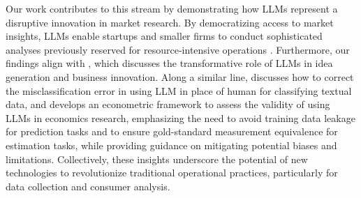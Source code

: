 Our work contributes to this stream by demonstrating how LLMs represent a disruptive innovation in market research. By democratizing access to market insights, LLMs enable startups and smaller firms to conduct sophisticated analyses previously reserved for resource-intensive operations \citep{olsen2020industry, choi2022disruptive}. Furthermore, our findings align with \cite{girotra2023ideas}, which discusses the transformative role of LLMs in idea generation and business innovation.
Along a similar line, \cite{connell2024estimating} discusses how to correct the misclassification error in using LLM in place of human for classifying textual data, and \cite{ludwig2024large} develops an econometric framework to assess the validity of using LLMs in economics research, emphasizing the need to avoid training data leakage for prediction tasks and to ensure gold-standard measurement equivalence for estimation tasks, while providing guidance on mitigating potential biases and limitations. 
Collectively, these insights underscore the potential of new technologies to revolutionize traditional operational practices, particularly for data collection and consumer analysis.